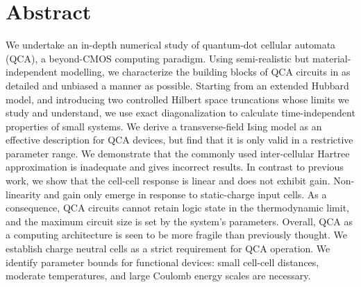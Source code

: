 \chapter{Abstract}

\begin{doublespace}
We undertake an in-depth numerical study of quantum-dot cellular automata (QCA),
a beyond-CMOS computing paradigm. Using semi-realistic but material-independent
modelling, we characterize the building blocks of QCA circuits in as detailed
and unbiased a manner as possible. Starting from an extended Hubbard model, and
introducing two controlled Hilbert space truncations whose limits we study
and understand, we use exact diagonalization to calculate time-independent
properties of small systems. We derive a transverse-field Ising model as an
effective description for QCA devices, but find that it is only valid in a
restrictive parameter range. We demonstrate that the commonly used
inter-cellular Hartree approximation is inadequate and gives incorrect results.
In contrast to previous work, we show that the cell-cell response is linear and
does not exhibit gain. Non-linearity and gain only emerge in response to
static-charge input cells. As a consequence, QCA circuits cannot retain logic
state in the thermodynamic limit, and the maximum circuit size is set by the
system's parameters. Overall, QCA as a computing architecture is seen to be more
fragile than previously thought. We establish charge neutral cells as a strict
requirement for QCA operation. We identify parameter bounds for functional
devices: small cell-cell distances, moderate temperatures, and large Coulomb
energy scales are necessary.
\end{doublespace}
